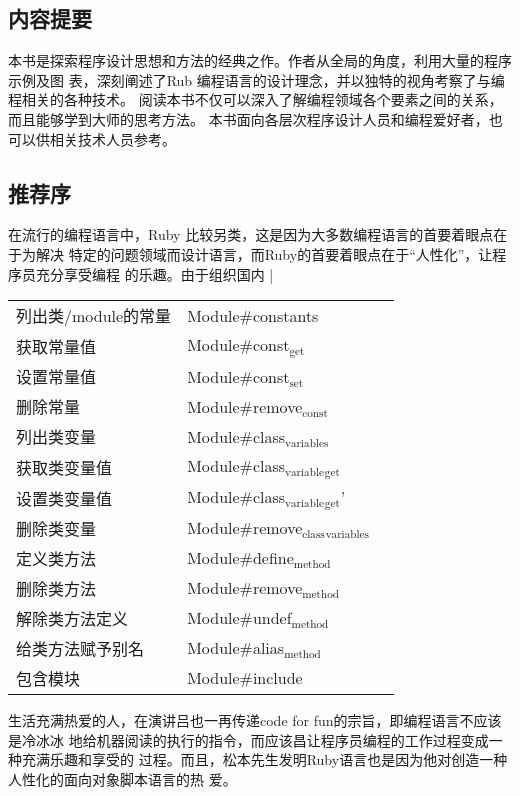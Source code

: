 \documentclass[color=cyan,mathpazo,titlestyle=hang]{elegantbook}
\begin{document}
\subsection{内容提要}
\label{sec:org2e47201}

本书是探索程序设计思想和方法的经典之作。作者从全局的角度，利用大量的程序示例及图
表，深刻阐述了Rub 编程语言的设计理念，并以独特的视角考察了与编程相关的各种技术。
阅读本书不仅可以深入了解编程领域各个要素之间的关系，而且能够学到大师的思考方法。
本书面向各层次程序设计人员和编程爱好者，也可以供相关技术人员参考。

\begin{LaTeX}
  \newpage
\end{LaTeX}

\subsection{推荐序}
\label{sec:org2ea6889}

在流行的编程语言中，Ruby 比较另类，这是因为大多数编程语言的首要着眼点在于为解决
特定的问题领域而设计语言，而Ruby的首要着眼点在于“人性化”，让程序员充分享受编程
的乐趣。由于组织国内  |
\begin{center}
  \begin{tabular}{lll}
    列出类/module的常量 & Module\#constants & \\
    获取常量值 & Module\#const\(_{\text{get}}\) & \\
    设置常量值 & Module\#const\(_{\text{set}}\) & \\
    删除常量 & Module\#remove\(_{\text{const}}\) & \\
    列出类变量 & Module\#class\(_{\text{variables}}\) & \\
    获取类变量值 & Module\#class\(_{\text{variable}}\)\(_{\text{get}}\) & \\
    设置类变量值 & Module\#class\(_{\text{variable}}\)\(_{\text{get}}\)' & \\
    删除类变量 & Module\#remove\(_{\text{class}}\)\(_{\text{variables}}\) & \\
    定义类方法 & Module\#define\(_{\text{method}}\) & \\
    删除类方法 & Module\#remove\(_{\text{method}}\) & \\
    解除类方法定义 & Module\#undef\(_{\text{method}}\) & \\
    给类方法赋予别名 & Module\#alias\(_{\text{method}}\) & \\
    包含模块 & Module\#include & \\
  \end{tabular}
\end{center}
生活充满热爱的人，在演讲吕也一再传递code for fun的宗旨，即编程语言不应该是冷冰冰
地给机器阅读的执行的指令，而应该昌让程序员编程的工作过程变成一种充满乐趣和享受的
过程。而且，松本先生发明Ruby语言也是因为他对创造一种人性化的面向对象脚本语言的热
爱。
\end{document}
